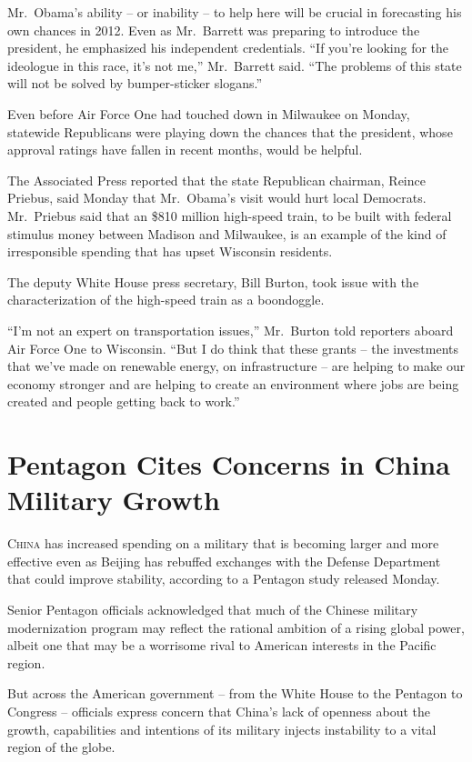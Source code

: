 ﻿\documentclass[12pt]{article}
\begin{document}
Mr.~Obama's ability -- or inability -- to help here will be crucial in forecasting his own chances
in 2012. Even as Mr.~Barrett was preparing to introduce the president, he emphasized his independent
credentials. ``If you're looking for the ideologue in this race, it's not me,'' Mr.~Barrett said.
``The problems of this state will not be solved by bumper-sticker slogans.''

Even before Air Force One had touched down in Milwaukee on Monday, statewide Republicans were
playing down the chances that the president, whose approval ratings have fallen in recent months,
would be helpful.

The Associated Press reported that the state Republican chairman, Reince Priebus, said Monday that
Mr.~Obama's visit would hurt local Democrats. Mr.~Priebus said that an \$810 million high-speed
train, to be built with federal stimulus money between Madison and Milwaukee, is an example of the
kind of irresponsible spending that has upset Wisconsin residents.

The deputy White House press secretary, Bill Burton, took issue with the characterization of the
high-speed train as a boondoggle.

``I'm not an expert on transportation issues,'' Mr.~Burton told reporters aboard Air Force One to
Wisconsin. ``But I do think that these grants -- the investments that we've made on renewable
energy, on infrastructure -- are helping to make our economy stronger and are helping to create an
environment where jobs are being created and people getting back to work.''

\section{Pentagon Cites Concerns in China Military Growth}

\lettrine{C}{hina} has increased spending on a military that is becoming
larger and more effective even as Beijing has rebuffed exchanges with the Defense Department that
could improve stability, according to a Pentagon study released Monday.

Senior Pentagon officials acknowledged that much of the Chinese military modernization program may
reflect the rational ambition of a rising global power, albeit one that may be a worrisome rival to
American interests in the Pacific region.

But across the American government -- from the White House to the Pentagon to Congress -- officials
express concern that China's lack of openness about the growth, capabilities and intentions of its
military injects instability to a vital region of the globe.
\end{document}

